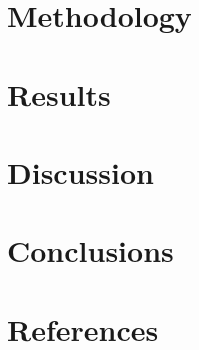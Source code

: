\documentclass[9pt]{article}
\begin{document}
	\section{Methodology}
    	
		\clearpage
		
	\section{Results}
	        
		\clearpage
		
	\section{Discussion}
    	
		\clearpage
		
	\section{Conclusions}
        
		\clearpage
		
	\section{References}
	    \setlength{}
		\printbibliography[heading=none]
	
	\begin{appendices}
        
    \end{appendices}
   
\end{document}
